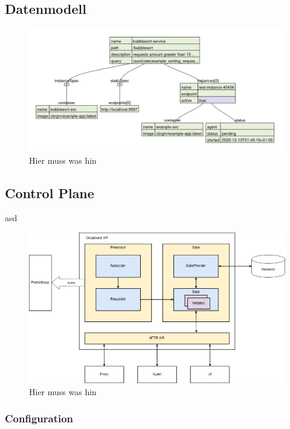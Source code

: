 \documentclass[runningheads]{llncs}
\begin{document}
\subsection{Datenmodell}

\begin{figure}[h]
	\centering
	\includegraphics[width=1.0\linewidth,scale=1.0]{images/datamodel.png}
	\caption{Hier muss was hin}
\end{figure}
	
\subsection{Control Plane} \label{control_plane}

asd
	
\begin{figure}[h]
	\centering
	\includegraphics[width=1.0\linewidth,scale=1.0]{images/autoscaler.png}
	\caption{Hier muss was hin}
\end{figure}

\subsubsection{Configuration}
	
\end{document}
